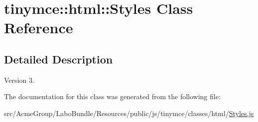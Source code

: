 \hypertarget{classtinymce_1_1html_1_1_styles}{\section{tinymce\+:\+:html\+:\+:Styles Class Reference}
\label{classtinymce_1_1html_1_1_styles}
}


\subsection{Detailed Description}
\begin{DoxyVersion}{Version}
3. 
\end{DoxyVersion}


The documentation for this class was generated from the following file\+:\begin{DoxyCompactItemize}
\item 
src/\+Acme\+Group/\+Labo\+Bundle/\+Resources/public/js/tinymce/classes/html/\hyperlink{_styles_8js}{Styles.\+js}\end{DoxyCompactItemize}
